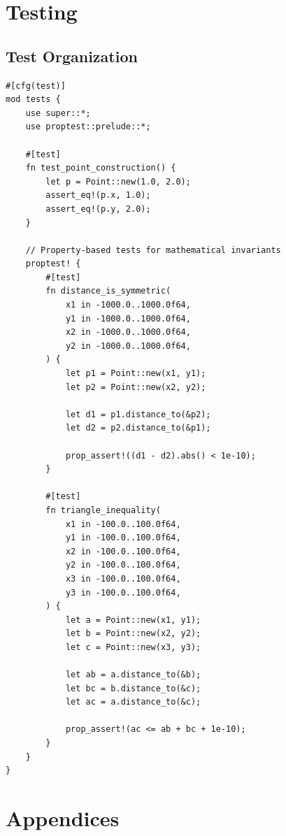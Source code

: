 \documentclass[11pt,a4paper,twoside]{report}
\begin{document}
\chapter{Testing}
\label{chap:testing}

\section{Test Organization}

\begin{lstlisting}[caption={Test module structure}, label=lst:tests]
#[cfg(test)]
mod tests {
    use super::*;
    use proptest::prelude::*;

    #[test]
    fn test_point_construction() {
        let p = Point::new(1.0, 2.0);
        assert_eq!(p.x, 1.0);
        assert_eq!(p.y, 2.0);
    }

    // Property-based tests for mathematical invariants
    proptest! {
        #[test]
        fn distance_is_symmetric(
            x1 in -1000.0..1000.0f64,
            y1 in -1000.0..1000.0f64,
            x2 in -1000.0..1000.0f64,
            y2 in -1000.0..1000.0f64,
        ) {
            let p1 = Point::new(x1, y1);
            let p2 = Point::new(x2, y2);

            let d1 = p1.distance_to(&p2);
            let d2 = p2.distance_to(&p1);

            prop_assert!((d1 - d2).abs() < 1e-10);
        }

        #[test]
        fn triangle_inequality(
            x1 in -100.0..100.0f64,
            y1 in -100.0..100.0f64,
            x2 in -100.0..100.0f64,
            y2 in -100.0..100.0f64,
            x3 in -100.0..100.0f64,
            y3 in -100.0..100.0f64,
        ) {
            let a = Point::new(x1, y1);
            let b = Point::new(x2, y2);
            let c = Point::new(x3, y3);

            let ab = a.distance_to(&b);
            let bc = b.distance_to(&c);
            let ac = a.distance_to(&c);

            prop_assert!(ac <= ab + bc + 1e-10);
        }
    }
}
\end{lstlisting}

\chapter{Appendices}
\label{chap:appendices}
\end{document}
